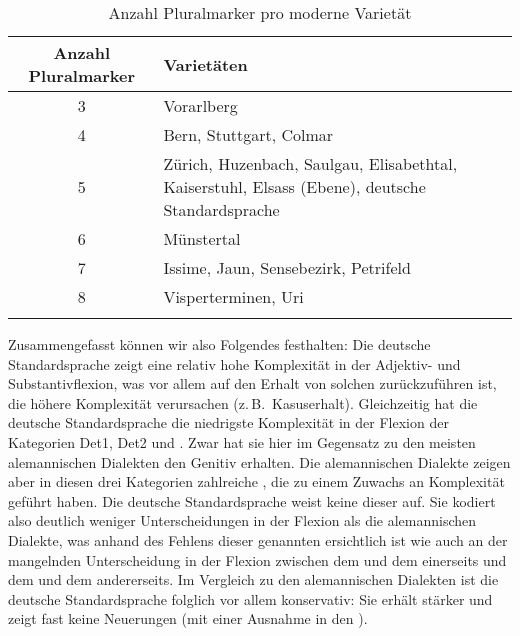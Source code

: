 
\begin{table}
\caption{Anzahl Pluralmarker pro moderne Varietät}\label{table6.21}
\begin{tabularx}{\textwidth}{cX}
\lsptoprule
{Anzahl Pluralmarker} & {Varietäten}\\
\midrule
3 & Vorarlberg\\
4 & Bern, Stuttgart, Colmar \\
5 & Zürich, Huzenbach, Saulgau, Elisabethtal, Kaiserstuhl, Elsass (Ebene), deutsche Standardsprache\\
6 & Münstertal\\
7 & Issime, Jaun, Sensebezirk, Petrifeld\\
8 & Visperterminen, Uri\\
\lspbottomrule
\end{tabularx}
\end{table}

{Zusammengefasst} können wir also Folgendes festhalten: Die deutsche Standardsprache zeigt eine relativ hohe Komplexität in der Adjektiv- und Substantivflexion, was vor allem auf den Erhalt von solchen  zurückzuführen ist, die höhere Komplexität verursachen (z.\,B.\ Kasuserhalt). Gleichzeitig hat die deutsche Standardsprache die niedrigste Komplexität in der Flexion der Kategorien Det1, Det2 und . Zwar hat sie hier im Gegensatz zu den meisten alemannischen Dialekten den Genitiv erhalten. Die alemannischen Dialekte zeigen aber in diesen drei Kategorien zahlreiche , die zu einem Zuwachs an Komplexität geführt haben. Die deutsche Standardsprache weist keine dieser  auf. Sie kodiert also deutlich weniger Unterscheidungen in der Flexion als die alemannischen Dialekte, was anhand des Fehlens dieser genannten  ersichtlich ist wie auch an der mangelnden Unterscheidung in der Flexion zwischen dem  und dem  einerseits und dem  und dem  andererseits. Im Vergleich zu den alemannischen Dialekten ist die deutsche Standardsprache folglich vor allem konservativ: Sie erhält stärker  und zeigt fast keine Neuerungen (mit einer Ausnahme in den ).\largerpage[2]

